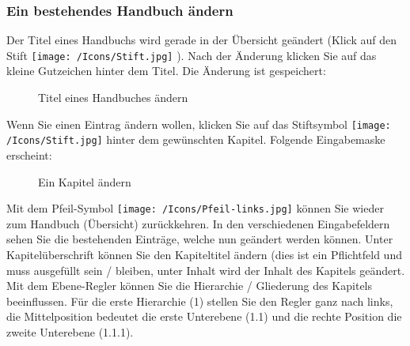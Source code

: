\subsubsection{Ein bestehendes Handbuch ändern}

Der Titel eines Handbuchs wird gerade in der Übersicht geändert (Klick auf den Stift \texttt{[image: /Icons/Stift.jpg]} ). Nach der Änderung klicken Sie auf das kleine Gutzeichen hinter dem Titel. Die Änderung ist gespeichert:

\begin{figure}[H]
\caption{Titel eines Handbuches ändern}
\end{figure}

Wenn Sie einen Eintrag ändern wollen, klicken Sie auf das Stiftsymbol \texttt{[image: /Icons/Stift.jpg]} hinter dem gewünschten Kapitel. Folgende Eingabemaske erscheint:

\begin{figure}[H]
\caption{Ein Kapitel ändern}
\end{figure}

Mit dem Pfeil-Symbol \texttt{[image: /Icons/Pfeil-links.jpg]}  können Sie wieder zum Handbuch (Übersicht) zurückkehren. In den verschiedenen Eingabefeldern sehen Sie die bestehenden Einträge, welche nun geändert werden können. Unter Kapitelüberschrift  können Sie den Kapiteltitel ändern (dies ist ein Pflichtfeld und muss ausgefüllt sein / bleiben, unter Inhalt  wird der Inhalt des Kapitels geändert. Mit dem Ebene-Regler  können Sie die Hierarchie / Gliederung des Kapitels beeinflussen. Für die erste Hierarchie (1) stellen Sie den Regler ganz nach links, die Mittelposition bedeutet die erste Unterebene (1.1) und die rechte Position die zweite Unterebene (1.1.1). \\

